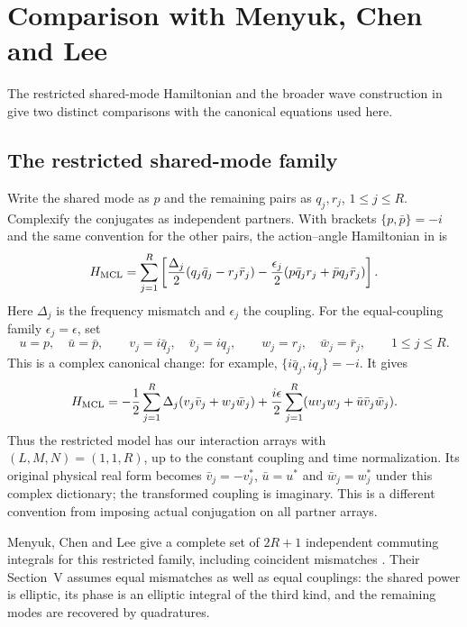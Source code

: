 \section{Comparison with Menyuk, Chen and Lee}
\label{sec:MCL-dictionary}

The restricted shared-mode Hamiltonian and the broader wave construction
in \cite{MenyukChenLee1983Integrable} give two distinct comparisons
with the canonical equations used here.

\subsection{The restricted shared-mode family}

Write the shared mode as $p$ and the remaining pairs as $q_j,r_j$,
$1\leq j\leq R$. Complexify the conjugates as independent partners.
With brackets $\{p,\bar p\}=-i$ and the same convention for the
other pairs, the action--angle Hamiltonian in
\cite[equation (1.1)]{MenyukChenLee1983Integrable} is
\begin{equation}\label{eq:MCL-star-H}
 H_{\rm MCL}=\sum_{j=1}^{R}\left[
 \frac{\Delta_j}{2}(q_j\bar q_j-r_j\bar r_j)
 -\frac{\epsilon_j}{2}
 (p\bar q_jr_j+\bar p q_j\bar r_j)\right].
\end{equation}
Here $\Delta_j$ is the frequency mismatch and $\epsilon_j$ the
coupling. For the equal-coupling family $\epsilon_j=\epsilon$, set
\[
 u=p,\quad\bar u=\bar p,\qquad
 v_j=i\bar q_j,\quad\bar v_j=iq_j,\qquad
 w_j=r_j,\quad\bar w_j=\bar r_j,
 \qquad1\leq j\leq R.
\]
This is a complex canonical change: for example,
$\{i\bar q_j,iq_j\}=-i$. It gives
\begin{equation}\label{eq:MCL-star-map}
 H_{\rm MCL}=-\frac12\sum_{j=1}^{R}\Delta_j
 (v_j\bar v_j+w_j\bar w_j)
 +\frac{i\epsilon}{2}\sum_{j=1}^{R}
 (uv_jw_j+\bar u\bar v_j\bar w_j).
\end{equation}
Thus the restricted model has our interaction arrays with
$(L,M,N)=(1,1,R)$, up to the constant coupling and time normalization.
Its original physical real form becomes $\bar v_j=-v_j^*$,
$\bar u=u^*$ and $\bar w_j=w_j^*$ under this complex dictionary;
the transformed coupling is imaginary. This is a different convention
from imposing actual conjugation on all partner arrays.

Menyuk, Chen and Lee give a complete set of $2R+1$ independent
commuting integrals for this restricted family, including coincident
mismatches \cite[Section~III]{MenyukChenLee1983Integrable}.
Their Section~V assumes equal mismatches as well as equal couplings:
the shared power is elliptic, its phase is an elliptic integral of
the third kind, and the remaining modes are recovered by quadratures.

